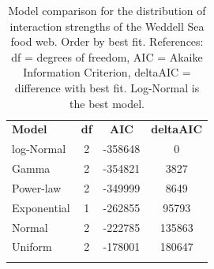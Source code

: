 \documentclass[gc, manuscript]{copernicus}
\begin{document}
\clearpage

\begin{table}[t]
\caption{Model comparison for the distribution of interaction strengths of the Weddell Sea food web. Order by best fit. References: df = degrees of freedom, AIC = Akaike Information Criterion, deltaAIC = difference with best fit. Log-Normal is the best model.}
\begin{tabular}{l c c c}
\tophline

\textbf{Model} & \textbf{df} & \textbf{AIC} & \textbf{deltaAIC} \\
\middlehline
log-Normal & 2 & -358648 & 0 \\
\middlehline
Gamma & 2 & -354821 & 3827 \\
\middlehline
Power-law & 2 & -349999 & 8649 \\
\middlehline
Exponential & 1 & -262855 & 95793 \\
\middlehline
Normal & 2 & -222785 & 135863 \\
\middlehline
Uniform & 2 & -178001 & 180647 \\

\bottomhline
\end{tabular}
\end{table}

\clearpage
\end{document}
